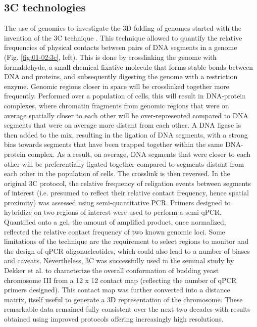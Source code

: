 \subsection{3C technologies}

The use of genomics to investigate the 3D folding of genomes started with the invention of the \acrfull{3C} technique \cite{dekkerCapturingChromosomeConformation2002}. This technique allowed to quantify the relative frequencies of physical contacts between pairs of DNA segments in a genome (Fig. \ref{fig:01-02:3c}, left). This is done by crosslinking the genome with formaldehyde, a small chemical fixative molecule that forms stable bonds between DNA and proteins, and subsequently digesting the genome with a restriction enzyme. Genomic regions closer in space will be crosslinked together more frequently. Performed over a population of cells, this will result in DNA-protein complexes, where chromatin fragments from genomic regions that were on average spatially closer to each other will be over-represented compared to DNA segments that were on average more distant from each other. A DNA ligase is then added to the mix, resulting in the ligation of DNA segments, with a strong bias towards segments that have been trapped together within the same DNA-protein complex. As a result, on average, DNA segments that were closer to each other will be preferentially ligated together compared to segments distant from each other in the population of cells. The crosslink is then reversed. In the original 3C protocol, the relative frequency of religation events between segments of interest (i.e. presumed to reflect their relative contact frequency, hence spatial proximity) was assessed using semi-quantitative \acrshort{PCR}. Primers designed to hybridize on two regions of interest were used to perform a semi-qPCR. Quantified onto a gel, the amount of amplified product, once normalized, reflected the relative contact frequency of two known genomic loci. Some limitations of the technique are the requirement to select regions to monitor and the design of qPCR oligonucleotides, which could also lead to a number of biases and caveats. Nevertheless, 3C was successfully used in the seminal study by Dekker et al. \cite{dekkerCapturingChromosomeConformation2002} to characterize the overall conformation of budding yeast chromosome III from a 12 x 12 contact map (reflecting the number of qPCR primers designed). This contact map was further converted into a distance matrix, itself useful to generate a 3D representation of the chromosome. These remarkable data remained fully consistent over the next two decades with results obtained using improved protocols offering increasingly high resolutions. 

